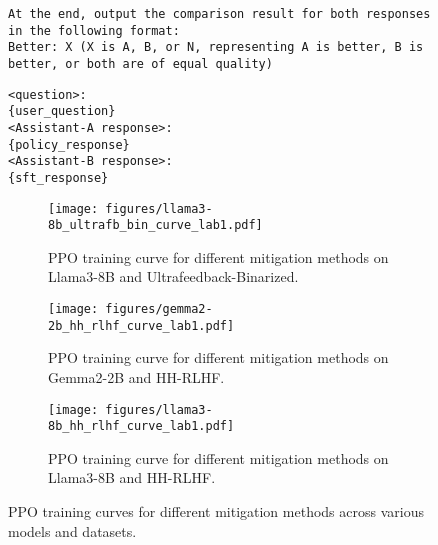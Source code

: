 \begin{figure*}[htb]
\begin{lstlisting}[caption={System Prompt For Winrate Evaluation on Test Set}]
At the end, output the comparison result for both responses in the following format:
Better: X (X is A, B, or N, representing A is better, B is better, or both are of equal quality)
\end{lstlisting}

\begin{lstlisting}[caption={User Input Template For Winrate Evaluation on Test Set}]
<question>:
{user_question}
<Assistant-A response>:
{policy_response}
<Assistant-B response>:
{sft_response}
\end{lstlisting}
\end{figure*}

\begin{figure*}[htbp]
    \centering
    \begin{subfigure}[b]{0.7\linewidth}
        \centering
        \texttt{[image: figures/llama3-8b\_ultrafb\_bin\_curve\_lab1.pdf]}
        \caption{PPO training curve for different mitigation methods on Llama3-8B and Ultrafeedback-Binarized.}
        \label{fig:llama3-8b_ultrafb_bin_lab1}
    \end{subfigure}
    
    \vspace{0.2cm} %
    
    \begin{subfigure}[b]{0.7\linewidth}
        \centering
        \texttt{[image: figures/gemma2-2b\_hh\_rlhf\_curve\_lab1.pdf]}
        \caption{PPO training curve for different mitigation methods on Gemma2-2B and HH-RLHF.}
        \label{fig:gemma2-2b_hh_rlhf_lab1}
    \end{subfigure}
    
    \vspace{0.2cm} %
    
    \begin{subfigure}[b]{0.7\linewidth}
        \centering
        \texttt{[image: figures/llama3-8b\_hh\_rlhf\_curve\_lab1.pdf]}
        \caption{PPO training curve for different mitigation methods on Llama3-8B and HH-RLHF.}
        \label{fig:llama3-8b_hh_rlhf_lab1}
    \end{subfigure}
    
    \caption{PPO training curves for different mitigation methods across various models and datasets.}
    \label{fig:ppo_training_curves}
\end{figure*}

